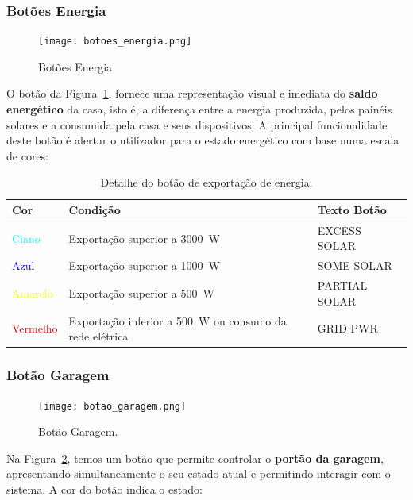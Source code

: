 \subsubsection{Botões Energia}

\begin{figure}[H]
    \centering
    \texttt{[image: botoes\_energia.png]}
    \caption{Botões Energia}
    \label{fig:botoes_energia.png}
\end{figure}

O botão da Figura~\ref{fig:botoes_energia.png}, fornece uma representação visual e imediata do \textbf{saldo energético} da casa, isto é, a diferença entre a energia produzida, pelos painéis solares e a consumida pela casa e seus dispositivos. A principal funcionalidade deste botão é alertar o utilizador para o estado energético com base numa escala de cores:

\begin{table}[H]
\centering
\begin{tabular}{|l|l|l|}
\hline
\textbf{Cor} & \textbf{Condição} & \textbf{Texto Botão} \\
\hline
\textcolor{cyan}{Ciano}   & Exportação superior a 3000~W & EXCESS SOLAR \\
\textcolor{blue}{Azul}    & Exportação superior a 1000~W & SOME SOLAR\\
\textcolor{yellow}{Amarelo} & Exportação superior a 500~W & PARTIAL SOLAR\\
\textcolor{red}{Vermelho} & Exportação inferior a 500~W ou consumo da rede elétrica & GRID PWR\\
\hline
\end{tabular}
\caption{Detalhe do botão de exportação de energia.}
\end{table}


\subsubsection{Botão Garagem}

\begin{figure}[H]
    \centering
    \texttt{[image: botao\_garagem.png]}
    \caption{Botão Garagem.}
    \label{fig:botao_garagem.png}
\end{figure}

Na Figura~\ref{fig:botao_garagem.png}, temos um botão que permite controlar o \textbf{portão da garagem}, apresentando simultaneamente o seu estado atual e permitindo interagir com o sistema. A cor do botão indica o estado:

